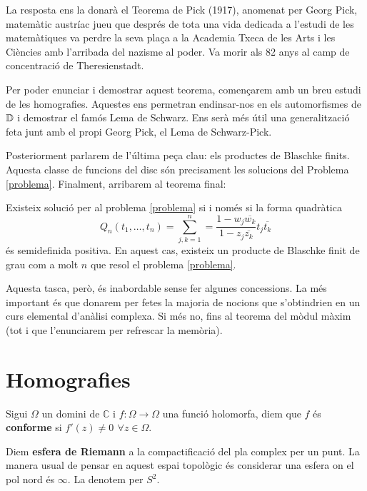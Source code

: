 \documentclass[dvipsnames, svgnames, leqno, a4paper, 12pt]{article}
\begin{document}
        La resposta ens la donarà el Teorema de Pick (1917), anomenat per Georg Pick, matemàtic austríac jueu que després de tota una vida dedicada a l'estudi de les matemàtiques va perdre la seva plaça a la Academia Txeca de les Arts i les Ciències amb l'arribada del nazisme al poder. Va morir als 82 anys al camp de concentració de Theresienstadt.


        Per poder enunciar i demostrar aquest teorema, començarem amb un breu estudi de les homografies. Aquestes ens permetran endinsar-nos en els automorfismes de \(\mathbb{D}\) i demostrar el famós Lema de Schwarz. Ens serà més útil una generalització feta junt amb el propi Georg Pick, el Lema de Schwarz-Pick.

        Posteriorment parlarem de l'última peça clau: els productes de Blaschke finits. Aquesta classe de funcions del disc són precisament les solucions del Problema \ref{problema}. Finalment, arribarem al teorema final:
        \begin{theorem*}[Pick]
            Existeix solució per al problema \ref{problema} 
            si i només si la forma quadràtica \begin{displaymath}
                Q_n(t_1,\dots,t_n)=\sum_{j,k=1}^n=\frac{1-w_j\overline{w_k}}{1-z_j\overline{z_k}}t_j\overline{t_k}
            \end{displaymath}
            és semidefinida positiva. En aquest cas, existeix un producte de Blaschke finit de grau com a molt $n$ que resol el problema \ref{problema}.
        \end{theorem*}

        Aquesta tasca, però, és inabordable sense fer algunes concessions. La més important és que donarem per fetes la majoria de nocions que s'obtindrien en un curs elemental d'anàlisi complexa. Si més no, fins al teorema del mòdul màxim (tot i que l'enunciarem per refrescar la memòria).



    \section{Homografies}
        Sigui  \(\Omega\) un domini de \(\mathbb{C}\) i \(f: \Omega\to\Omega\) una funció holomorfa, diem que \(f\) és \textbf{conforme} si \(f'(z) \neq 0\,\  \forall z\in\Omega\).
        
        Diem \textbf{esfera de Riemann} a la compactificació del pla complex per un punt. La manera usual de pensar en aquest espai topològic és considerar una esfera on el pol nord és \(\infty\). La denotem per \(S^2\).
\end{document}
